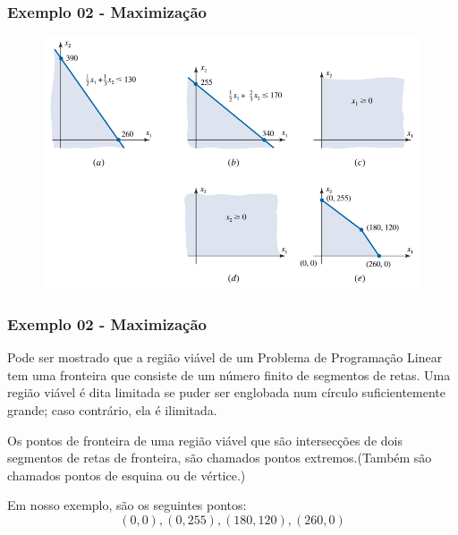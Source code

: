 \documentclass[hyperref={pdfpagelabels=false}]{beamer}
\begin{document}
\begin{frame}
\frametitle{Exemplo 02 - Maximização}


\begin{figure}[!h]
	\centering
	\includegraphics[scale=0.5]{ex2}
	\label{ex2}
\end{figure}

\end{frame}

\begin{frame}
\frametitle{Exemplo 02 - Maximização}

Pode ser mostrado que a região viável de um Problema de Programação Linear tem uma fronteira que consiste de um número finito de segmentos de retas. Uma região viável é dita limitada se puder ser englobada num círculo suficientemente grande; caso contrário, ela é ilimitada.

\pause

Os pontos de fronteira de uma região viável que são intersecções de dois segmentos de retas de fronteira, são chamados pontos extremos.(Também são chamados pontos de esquina ou de vértice.)

\pause

Em nosso exemplo, são os seguintes pontos:
$$ (0,0), (0,255), (180,120), (260,0) $$


\end{frame}
\end{document}
